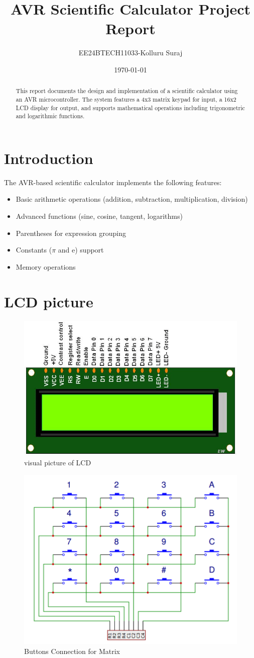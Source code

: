 \documentclass{article}
\title{AVR Scientific Calculator Project Report}
\author{EE24BTECH11033-Kolluru Suraj}
\date{\today}
\begin{document}
\maketitle

\begin{abstract}
This report documents the design and implementation of a scientific calculator using an AVR microcontroller. The system features a 4x3 matrix keypad for input, a 16x2 LCD display for output, and supports mathematical operations including trigonometric and logarithmic functions.
\end{abstract}

\section{Introduction}
The AVR-based scientific calculator implements the following features:
\begin{itemize}
\item Basic arithmetic operations (addition, subtraction, multiplication, division)
\item Advanced functions (sine, cosine, tangent, logarithms)
\item Parentheses for expression grouping
\item Constants ($\pi$ and e) support
\item Memory operations
\end{itemize}
\section{LCD picture}
\begin{figure}[H]
    \centering
    \includegraphics[width=0.5\linewidth]{figs/lcd.jpeg}
    \caption{visual picture of LCD}
    \label{fig:enter-label}
\end{figure}
\begin{figure}
    \centering
    \includegraphics[width=0.5\linewidth]{figs/matrixbutton.png}
    \caption{Buttons Connection for Matrix}
    \label{fig:enter-label}
\end{figure}
\end{document}
